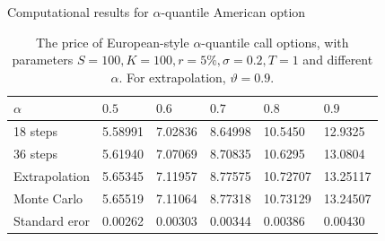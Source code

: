 \documentclass[cjk,10pt]{beamer}
\begin{document}
%






\begin{frame}{Computational results for $\alpha$-quantile American option}
\begin{table}[p]
\caption{The price of European-style $\alpha$-quantile call options, with parameters
	$S=100, K=100, r=5\%, \sigma=0.2, T=1$ and different $\alpha$. For extrapolation, $\vartheta=0.9$.}
\begin{center}
\begin{tabular}{l|lllll}
$\alpha$ & $0.5$ & $0.6$ & $0.7$ & $0.8$ & $0.9$       \\
\hline
18 steps  & 5.58991 & 7.02836 & 8.64998 & 10.5450 & 12.9325\\
36 steps  & 5.61940 & 7.07069 & 8.70835 & 10.6295 & 13.0804\\
\hline
Extrapolation  & 5.65345  & 7.11957  & 8.77575 & 10.72707 &13.25117 \\
\hline
Monte Carlo & 5.65519 &7.11064 & 8.77318 & 10.73129 & 13.24507\\
Standard eror &  0.00262 & 0.00303 & 0.00344 & 0.00386 & 0.00430    
\end{tabular}
\end{center}
\label{fig:euro9}
\end{table}%

\end{frame}
\end{document}
